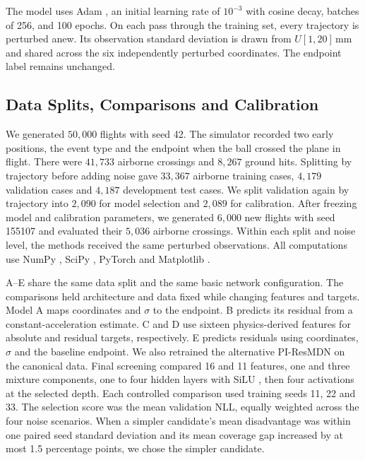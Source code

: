 \documentclass[11pt,a4paper]{article}
\begin{document}
The model uses Adam \cite{kingma2015}, an initial learning rate of $10^{-3}$ with cosine decay, batches of 256, and 100 epochs. On each pass through the training set, every trajectory is perturbed anew. Its observation standard deviation is drawn from $U[1,20]\,\mathrm{mm}$ and shared across the six independently perturbed coordinates. The endpoint label remains unchanged.

\subsection{Data Splits, Comparisons and Calibration}
\label{sec:splits}

We generated $50{,}000$ flights with seed 42. The simulator recorded two early positions, the event type and the endpoint when the ball crossed the plane in flight. There were $41{,}733$ airborne crossings and $8{,}267$ ground hits. Splitting by trajectory before adding noise gave $33{,}367$ airborne training cases, $4{,}179$ validation cases and $4{,}187$ development test cases. We split validation again by trajectory into $2{,}090$ for model selection and $2{,}089$ for calibration. After freezing model and calibration parameters, we generated $6{,}000$ new flights with seed 155107 and evaluated their $5{,}036$ airborne crossings. Within each split and noise level, the methods received the same perturbed observations. All computations use NumPy \cite{harris2020}, SciPy \cite{virtanen2020}, PyTorch \cite{paszke2019} and Matplotlib \cite{hunter2007}.

A--E share the same data split and the same basic network configuration. The comparisons held architecture and data fixed while changing features and targets. Model A maps coordinates and $\sigma$ to the endpoint. B predicts its residual from a constant-acceleration estimate. C and D use sixteen physics-derived features for absolute and residual targets, respectively. E predicts residuals using coordinates, $\sigma$ and the baseline endpoint. We also retrained the alternative PI-ResMDN on the canonical data. Final screening compared 16 and 11 features, one and three mixture components, one to four hidden layers with SiLU \cite{silu2018}, then four activations at the selected depth. Each controlled comparison used training seeds 11, 22 and 33. The selection score was the mean validation NLL, equally weighted across the four noise scenarios. When a simpler candidate's mean disadvantage was within one paired seed standard deviation and its mean coverage gap increased by at most 1.5 percentage points, we chose the simpler candidate.
\end{document}
